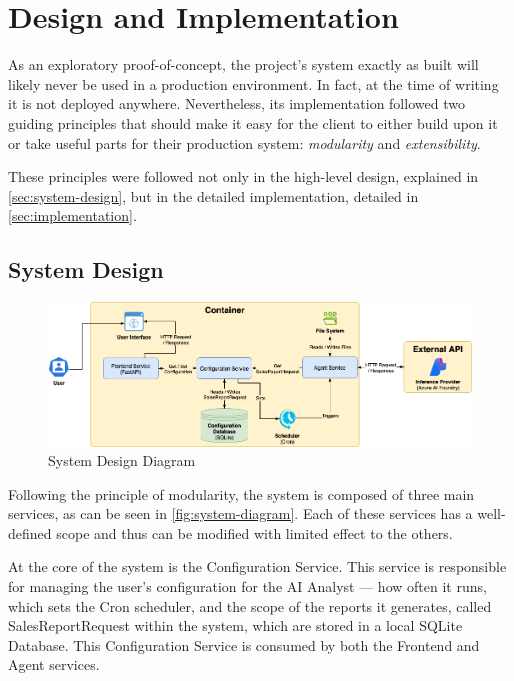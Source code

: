 \documentclass[a4paper]{report}
\begin{document}
\chapter{Design and Implementation}
\label{chapter:design-implementation}

As an exploratory proof-of-concept, the project's system exactly as built will likely never be used in a production environment. In fact, at the time of writing it is not deployed anywhere. Nevertheless, its implementation followed two guiding principles that should make it easy for the client to either build upon it or take useful parts for their production system: \textit{modularity} and \textit{extensibility}.

These principles were followed not only in the high-level design, explained in \autoref{sec:system-design}, but in the detailed implementation, detailed in \autoref{sec:implementation}.

\section{System Design}
\label{sec:system-design}

\begin{figure}[h]
\centering
\includegraphics[width=1\textwidth]{images/system-diagram.png}
\caption{System Design Diagram}
\label{fig:system-diagram}
\end{figure}

Following the principle of modularity, the system is composed of three main services, as can be seen in \autoref{fig:system-diagram}. Each of these services has a well-defined scope and thus can be modified with limited effect to the others.

At the core of the system is the Configuration Service. This service is responsible for managing the user's configuration for the AI Analyst --- how often it runs, which sets the Cron scheduler, and the scope of the reports it generates, called SalesReportRequest within the system, which are stored in a local SQLite Database. This Configuration Service is consumed by both the Frontend and Agent services.
\end{document}
